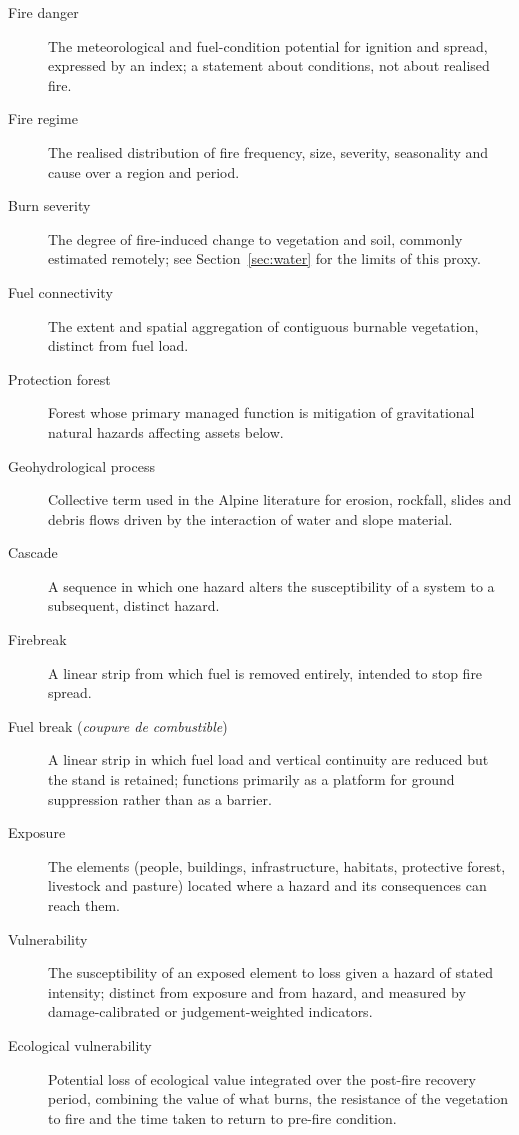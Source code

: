 \documentclass[11pt,a4paper]{article}
\begin{document}
\begin{description}
    \item[Fire danger] The meteorological and fuel-condition potential for ignition and spread, expressed by an index; a statement about conditions, not about realised fire.
    \item[Fire regime] The realised distribution of fire frequency, size, severity, seasonality and cause over a region and period.
    \item[Burn severity] The degree of fire-induced change to vegetation and soil, commonly estimated remotely; see Section~\ref{sec:water} for the limits of this proxy.
    \item[Fuel connectivity] The extent and spatial aggregation of contiguous burnable vegetation, distinct from fuel load.
    \item[Protection forest] Forest whose primary managed function is mitigation of gravitational natural hazards affecting assets below.
    \item[Geohydrological process] Collective term used in the Alpine literature for erosion, rockfall, slides and debris flows driven by the interaction of water and slope material.
    \item[Cascade] A sequence in which one hazard alters the susceptibility of a system to a subsequent, distinct hazard.
    \item[Firebreak] A linear strip from which fuel is removed entirely, intended to stop fire spread.
    \item[Fuel break (\emph{coupure de combustible})] A linear strip in which fuel load and vertical continuity are reduced but the stand is retained; functions primarily as a platform for ground suppression rather than as a barrier.
    \item[Exposure] The elements (people, buildings, infrastructure, habitats, protective forest, livestock and pasture) located where a hazard and its consequences can reach them.
    \item[Vulnerability] The susceptibility of an exposed element to loss given a hazard of stated intensity; distinct from exposure and from hazard, and measured by damage-calibrated or judgement-weighted indicators.
    \item[Ecological vulnerability] Potential loss of ecological value integrated over the post-fire recovery period, combining the value of what burns, the resistance of the vegetation to fire and the time taken to return to pre-fire condition.
\end{description}




\end{document}
